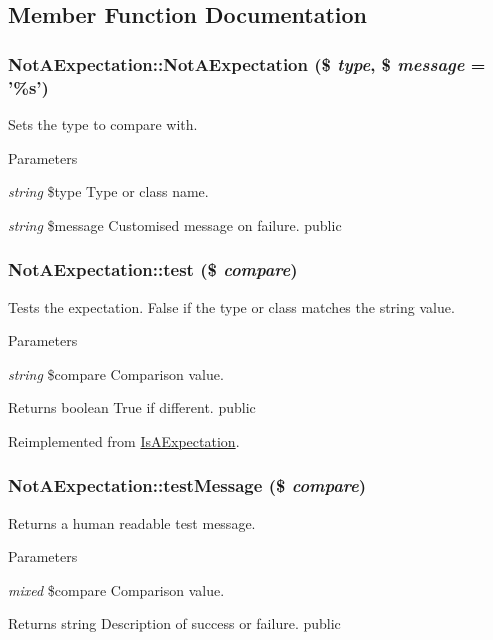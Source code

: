 \subsection{Member Function Documentation}
\hypertarget{class_not_a_expectation_ac5376f9e05d830a311ca7cae4beb2af8}{
\subsubsection[{NotAExpectation}]{\setlength{\rightskip}{0pt plus 5cm}NotAExpectation::NotAExpectation (\$ {\em type}, \/  \$ {\em message} = {\ttfamily '\%s'})}}
\label{class_not_a_expectation_ac5376f9e05d830a311ca7cae4beb2af8}
Sets the type to compare with. 
\begin{DoxyParams}{Parameters}
\item[{\em string}]\$type Type or class name. \item[{\em string}]\$message Customised message on failure.  public \end{DoxyParams}
\hypertarget{class_not_a_expectation_a627e4e3a4514de8f869eaa5f62a5e206}{
\subsubsection[{test}]{\setlength{\rightskip}{0pt plus 5cm}NotAExpectation::test (\$ {\em compare})}}
\label{class_not_a_expectation_a627e4e3a4514de8f869eaa5f62a5e206}
Tests the expectation. False if the type or class matches the string value. 
\begin{DoxyParams}{Parameters}
\item[{\em string}]\$compare Comparison value. \end{DoxyParams}
\begin{DoxyReturn}{Returns}
boolean True if different.  public 
\end{DoxyReturn}


Reimplemented from \hyperlink{class_is_a_expectation_a759f6a0c54751334dbb7a8aed01a3858}{IsAExpectation}.\hypertarget{class_not_a_expectation_aecc6099e1b98a0b00f798e43a8add4fa}{
\subsubsection[{testMessage}]{\setlength{\rightskip}{0pt plus 5cm}NotAExpectation::testMessage (\$ {\em compare})}}
\label{class_not_a_expectation_aecc6099e1b98a0b00f798e43a8add4fa}
Returns a human readable test message. 
\begin{DoxyParams}{Parameters}
\item[{\em mixed}]\$compare Comparison value. \end{DoxyParams}
\begin{DoxyReturn}{Returns}
string Description of success or failure.  public 
\end{DoxyReturn}


